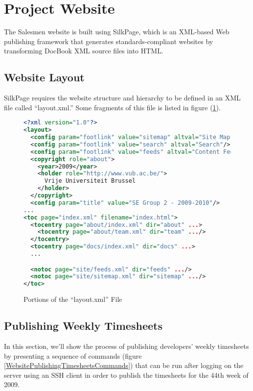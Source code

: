 \section{Project Website}\label{Website}

The Salesmen website is built using SilkPage, which is an XML-based 
Web publishing framework that generates standards-compliant websites by
transforming DocBook XML source files into HTML.

\subsection{Website Layout}\label{WebsiteLayout}
SilkPage requires the website structure and hierarchy to be defined in an
XML file called ``layout.xml.'' Some fragments of this file is listed in
figure (\ref{WebsiteLayoutFile}).

\begin{figure}\caption{Portions of the ``layout.xml'' File}
\label{WebsiteLayoutFile}
\begin{lstlisting}[language=XML]
<?xml version="1.0"?>
<layout>
  <config param="footlink" value="sitemap" altval="Site Map"/>
  <config param="footlink" value="search" altval="Search"/>
  <config param="footlink" value="feeds" altval="Content Feeds"/>
  <copyright role="about">
    <year>2009</year>
    <holder role="http://www.vub.ac.be/">
      Vrije Universiteit Brussel
    </holder>
  </copyright>
  <config param="title" value="SE Group 2 - 2009-2010"/>
...
<toc page="index.xml" filename="index.html">
  <tocentry page="about/index.xml" dir="about" ...>
    <tocentry page="about/team.xml" dir="team" .../>
  </tocentry>
  <tocentry page="docs/index.xml" dir="docs" ...>
  ...

  <notoc page="site/feeds.xml" dir="feeds" .../>
  <notoc page="site/sitemap.xml" dir="sitemap" .../>
</toc>
\end{lstlisting}
\end{figure}

\subsection{Publishing Weekly Timesheets}\label{WebsitePublishingTimesheets}

In this section, we'll show the process of publishing developers' weekly
timesheets by presenting a sequence of commands (figure \ref{WebsitePublishingTimesheetsCommands}) that can be run after 
logging on the server using an SSH client in order to publish the timesheets
for the 44th week of 2009.


